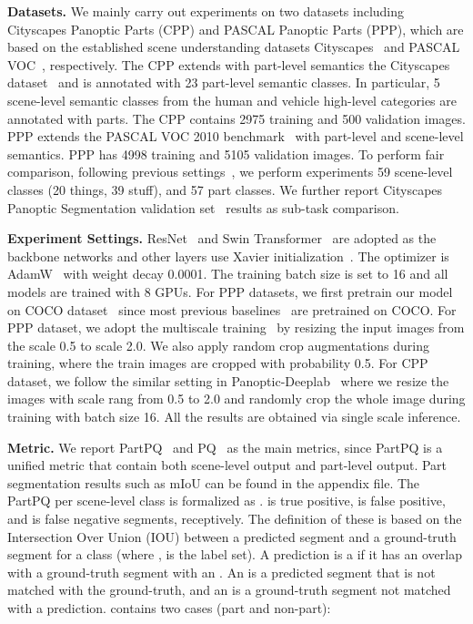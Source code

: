 \noindent
\textbf{Datasets.}
We mainly carry out experiments on two datasets including Cityscapes Panoptic Parts (CPP) and PASCAL Panoptic Parts (PPP), which are based on the established scene understanding datasets Cityscapes~\cite{cordts2016cityscapes} and PASCAL VOC~\cite{Everingham2010Pascal}, respectively. The CPP extends with part-level semantics the Cityscapes dataset~\cite{cordts2016cityscapes} and is annotated with 23 part-level semantic classes. In particular, 5 scene-level semantic classes from the {human} and {vehicle} high-level categories are annotated with parts. The CPP contains 2975 training and 500 validation images. PPP extends the PASCAL VOC 2010 benchmark~\cite{Everingham2010Pascal} with part-level and scene-level semantics. PPP has 4998 training and 5105 validation images. To perform fair comparison, following previous settings~\cite{degeus2021panopticparts,Everingham2010Pascal}, we perform experiments 59 scene-level classes (20 things, 39 stuff), and 57 part classes.  We further report Cityscapes Panoptic Segmentation validation set~\cite{cordts2016cityscapes} results as sub-task comparison.


\noindent
\textbf{Experiment Settings.} ResNet~\cite{resnet} and Swin Transformer~\cite{liu2021swin} are adopted as the backbone networks and other layers use Xavier initialization~\cite{xavier_init}. The optimizer is AdamW~\cite{ADAMW} with weight decay 0.0001. The training batch size is set to 16 and all models are trained with 8 GPUs. For PPP datasets, we first pretrain our model on COCO dataset~\cite{coco_dataset} since most previous baselines~\cite{degeus2021panopticparts} are pretrained on COCO. For PPP dataset, we adopt the multiscale training~\cite{detr} by resizing the input images from the scale 0.5 to scale 2.0. We also apply random crop augmentations during training, where the train images are cropped with probability 0.5. For CPP dataset, we follow the similar setting in Panoptic-Deeplab~\cite{cheng2020panoptic} where we resize the images with scale rang from 0.5 to 2.0 and randomly crop the whole image during training with batch size 16. All the results are obtained via single scale inference. 

\noindent
\textbf{Metric.}
We report PartPQ~\cite{degeus2021panopticparts} and PQ~\cite{kirillov2019panoptic} as the main metrics, since PartPQ is a unified metric that contain both scene-level output and part-level output. Part segmentation results such as mIoU can be found in the appendix file. The PartPQ per scene-level class  is formalized as .  is true positive,  is false positive, and  is false negative segments, receptively. The definition of these is based on the Intersection Over Union (IOU) between a predicted segment  and a ground-truth segment  for a class  (where ,  is the label set). A prediction is a  if it has an overlap with a ground-truth segment with an . An  is a predicted segment that is not matched with the ground-truth, and an  is a ground-truth segment not matched with a prediction.  contains two cases (part and non-part): 





